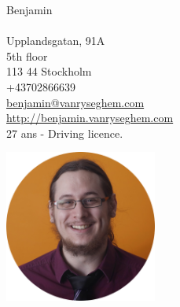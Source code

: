 \documentclass{curve}
\title{}
\begin{document}
\begin{minipage}{7cm}
\large
Benjamin \\
\normalsize
\\
Upplandsgatan, 91A\\
5th floor\\
113 44 Stockholm\\
+43702866639\\
\href{mailto:benjamin@vanryseghem.com}{benjamin@vanryseghem.com}\\
\href{http://benjamin.vanryseghem.com}{\underline{http://benjamin.vanryseghem.com}}\\
27 ans - Driving licence.
\end{minipage}
\hfill
\begin{minipage}{7cm}
  \begin{flushright}
  \includegraphics[height=5cm]{Moi}
  \end{flushright}
\end{minipage}
\maketitle
\vspace{-1cm}

\end{document}
